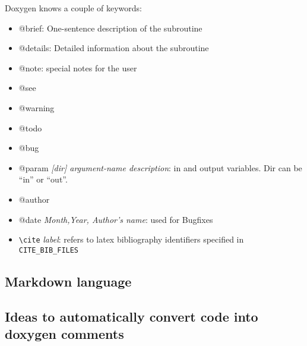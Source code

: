 \documentclass[11pt,a4paper]{report}
\begin{document}
Doxygen knows a couple of keywords:
\begin{itemize}
\item @brief: One-sentence description of the subroutine
\item @details: Detailed information about the subroutine
\item @note: special notes for the user
\item @see
\item @warning
\item @todo
\item @bug
\item @param \textit{[dir] argument-name description}: in and output variables. Dir can be ``in'' or ``out''.
\item @author
\item @date \textit{Month,Year, Author's name}: used for Bugfixes
\item \verb|\cite| \textit{label}: refers to latex bibliography
  identifiers specified in \verb|CITE_BIB_FILES|
\end{itemize}

\subsection{Markdown language}



\subsection{Ideas to automatically convert code into doxygen comments}
\end{document}
